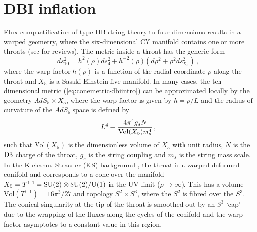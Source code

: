 % 
% 
\section{DBI inflation} 
% 
\label{sec:dbiinflation}
Flux compactification of type IIB string theory to four dimensions 
results in a warped geometry, where the six-dimensional CY  
manifold contains one or more throats (see \cite{grana,douglas} for reviews). 
The metric inside a throat has the generic form
% 
\begin{equation}
\label{eq:conemetric-dbiintro}
ds_{10}^2= h^2 ( \rho) ds_4^2 + h^{-2} (\rho ) 
\left( d\rho^2 +\rho^2 ds_{X_5}^2 \right) \,,
\end{equation}
%  
where the warp factor $h (\rho)$ is a function of the 
radial coordinate $\rho$ along the throat and $X_5$
is a Sasaki-Einstein five-manifold. 
In many cases, the ten-dimensional metric (\ref{eq:conemetric-dbiintro}) can be 
approximated locally by the geometry $AdS_5 \times X_5$, where the 
warp factor is given by $h=\rho /L$ and 
the radius of curvature of the $AdS_5$ space is defined by
%  
\begin{equation}
L^4 \equiv \frac{4\pi^4 g_s N}{{\rm Vol} (X_5) m_s^4} \,,
\end{equation}
% 
such that $\mathrm{Vol}(X_5)$ is the dimensionless volume of 
$X_5$ with unit radius, $N$ is the ${\rm D3}$  charge of the throat, 
$g_s$ is the string coupling and $m_s$ is the string mass scale.
In the Klebanov-Strassler (KS) background \cite{ks}, the throat 
is a warped deformed conifold and 
corresponds to a cone over the manifold 
$X_5 = T^{1,1}= {\rm SU(2)} \otimes {\rm SU(2)}/{\rm U(1)}$
in the UV limit ($\rho \rightarrow \infty$). This has   
a volume $\mathrm{Vol} (T^{1,1}) = 16\pi^3/27$ and  topology
$S^2\times S^3$, where the $S^2$ is fibred over the $S^3$.
The conical singularity at the tip of the throat 
is smoothed out by an 
$S^3$ `cap' due to the wrapping of the fluxes along the cycles of the conifold
\cite{ks,kt} and the warp factor asymptotes to 
a constant value in this region.   
 

